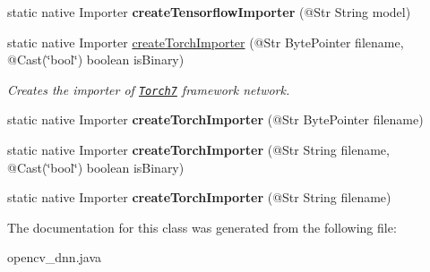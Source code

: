 \begin{DoxyCompactItemize}
static native Importer {\bfseries create\+Tensorflow\+Importer} (@Str String model)
\item 
static native Importer \hyperlink{group__dnn_gae0f202e183aadc4ec86abda60b0e6adf}{create\+Torch\+Importer} (@Str Byte\+Pointer filename, @Cast(\char`\"{}bool\char`\"{}) boolean is\+Binary)
\begin{DoxyCompactList}\small\item\em Creates the importer of \href{http://torch.ch}{\tt Torch7} framework network. \end{DoxyCompactList}\item 
static native Importer {\bfseries create\+Torch\+Importer} (@Str Byte\+Pointer filename)
\item 
static native Importer {\bfseries create\+Torch\+Importer} (@Str String filename, @Cast(\char`\"{}bool\char`\"{}) boolean is\+Binary)
\item 
static native Importer {\bfseries create\+Torch\+Importer} (@Str String filename)
\end{DoxyCompactItemize}


The documentation for this class was generated from the following file\+:\begin{DoxyCompactItemize}
\item 
opencv\+\_\+dnn.\+java\end{DoxyCompactItemize}
